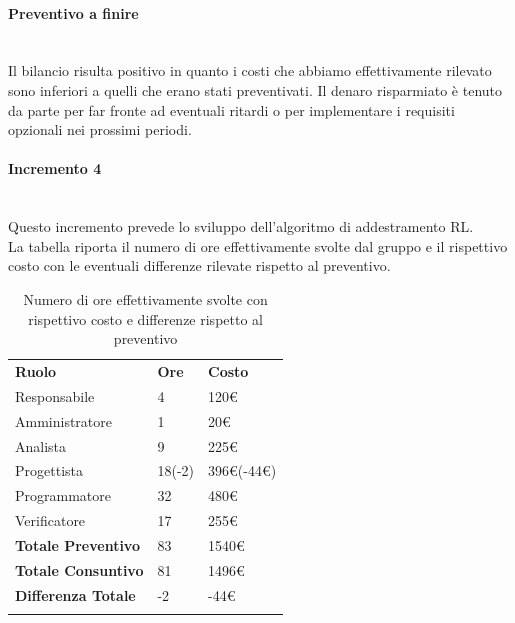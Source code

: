 \paragraph*{Preventivo a finire} \mbox{} \\
Il bilancio risulta positivo in quanto i costi che abbiamo effettivamente rilevato sono inferiori a quelli che erano stati preventivati. Il denaro risparmiato è tenuto da parte per far fronte ad eventuali ritardi o per implementare i requisiti opzionali nei prossimi periodi.


\paragraph{Incremento 4}  \mbox{} \\
Questo incremento prevede lo sviluppo dell'algoritmo di addestramento RL\glo. \\
La tabella riporta il numero di ore effettivamente svolte dal gruppo e il rispettivo costo con le eventuali differenze rilevate rispetto al preventivo.
\begin{longtable} {							
		>{}p{40mm}  
		>{}p{20mm}	
		>{}p{28mm}			
	}			
	\rowcolor{gray!50}
	
	\textbf{Ruolo}            & \textbf{Ore} & \textbf{Costo}       \TBstrut \\
	Responsabile              & 4            & 120\euro             \TBstrut \\
	Amministratore            & 1            & 20\euro              \TBstrut \\
	Analista                  & 9            & 225\euro             \TBstrut \\
	Progettista               & 18(-2)       & 396\euro(-44\euro)   \TBstrut \\
	Programmatore             & 32           & 480\euro             \TBstrut \\
	Verificatore              & 17           & 255\euro             \TBstrut \\
	\textbf{Totale Preventivo}& 83           & 1540\euro            \TBstrut \\	
	\textbf{Totale Consuntivo}& 81           & 1496\euro            \TBstrut \\	
	\textbf{Differenza Totale}& -2           & -44\euro             \TBstrut \\
	\rowcolor{white}
	\caption{Numero di ore effettivamente svolte con rispettivo costo e differenze rispetto al preventivo}	
\end{longtable}

